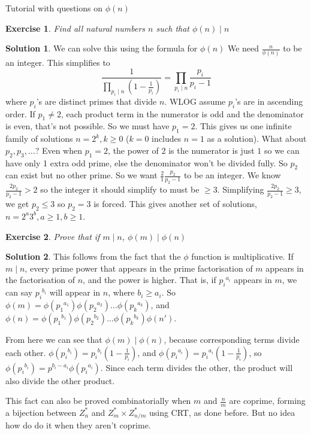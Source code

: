 \documentclass[a4paper,10pt]{article}
\newtheorem{exercise}{Exercise}[section]
\theoremstyle{definition} %
\newtheorem*{solution}{Solution}
\begin{document}
    Tutorial with questions on $\phi(n)$

    \begin{exercise}
        Find all natural numbers $n$ such that $\phi(n) \mid n$
    \end{exercise}

    \begin{solution}
        We can solve this using the formula for $\phi(n)$
        We need $\frac{n}{\phi(n)}$ to be an integer. This simplifies to 
        \[ \frac{1}{\prod_{p_i \mid n} (1-\frac{1}{p_i})} = \prod_{p_i \mid n} \frac{p_i}{p_i-1}\]
        where $p_i$'s are distinct primes that divide $n$. WLOG assume $p_i$'s are in
        ascending order.
        If $p_1 \neq 2$, each product term in the numerator is odd and the denominator is even,
        that's not possible. So we must have $p_1 = 2$. This gives us one infinite family of solutions
        $n = 2^k, k \geq 0$ ($k = 0$ includes $n=1$ as a solution). What about $p_2, p_3, \dots$? 
        Even when $p_1 = 2$, the power of $2$ is the numerator is just $1$ so we can have only 1 extra 
        odd prime, else the denominator won't be divided fully. So $p_2$ can exist but no other prime.
        So we want $\frac{2}{1}\frac{p_2}{p_2-1}$ to be an integer. We know $\frac{2p_2}{p_2-1} > 2$
        so the integer it should simplify to must be $\geq 3$. Simplifying $\frac{2p_2}{p_2-1} \geq 3$, 
        we get $p_2 \leq 3$ so $p_2 = 3$ is forced. This gives another set of solutions, $n = 2^a3^b,
        a \geq 1, b \geq 1$.
    \end{solution}

    \begin{exercise}
        Prove that if $m \mid n$, $\phi(m) \mid \phi(n)$
    \end{exercise}

    \begin{solution}
        This follows from the fact that the $\phi$ function is multiplicative.
        If $m \mid n$, every prime power that appears in the prime factorisation
        of $m$ appears in the factorisation of $n$, and the power is higher.
        That is, if ${p_i}^{a_i}$ appears in $m$, we can say ${p_i}^{b_i}$ will appear
        in $n$, where $b_i \geq a_i$.
        So $\phi(m) = \phi({p_1}^{a_1})\phi({p_2}^{a_2})\dots\phi({p_k}^{a_k})$, and
        $\phi(n) = \phi({p_1}^{b_1})\phi({p_2}^{b_2})\dots\phi({p_k}^{b_k})\phi(n')$.

        From here we can see that $\phi(m) \mid \phi(n)$, because corresponding terms divide
        each other. $\phi({p_i}^{b_i}) = {p_i}^{b_i}(1-\frac{1}{p_i})$, and $\phi({p_i}^{a_i}) 
        = {p_i}^{a_i}(1-\frac{1}{p_i})$, so $\phi({p_i}^{b_i}) = p^{b_i-a_i}\phi({p_i}^{a_i})$.
        Since each term divides the other, the product will also divide the other product.

        This fact can also be proved combinatorially when $m$ and $\frac{n}{m}$ are coprime,
        forming a bijection between $Z_n^*$ and $Z_m^* \times Z_{n/m}^*$ using CRT, 
        as done before. But no idea how do do it when they aren't coprime.
    \end{solution}
\end{document}

